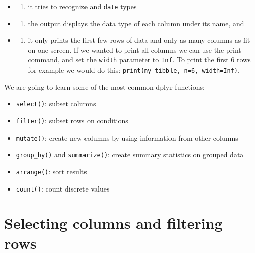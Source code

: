 \documentclass[
]{book}
\providecommand{\tightlist}{%
  \setlength{\itemsep}{0pt}\setlength{\parskip}{0pt}}
\begin{document}
\begin{itemize}
\item
  \begin{enumerate}
  \def\labelenumi{(\arabic{enumi})}
  \tightlist
  \item
    it tries to recognize and \texttt{date} types
  \end{enumerate}
\item
  \begin{enumerate}
  \def\labelenumi{(\arabic{enumi})}
  \setcounter{enumi}{1}
  \tightlist
  \item
    the output displays the data type of each column under its name, and
  \end{enumerate}
\item
  \begin{enumerate}
  \def\labelenumi{(\arabic{enumi})}
  \setcounter{enumi}{2}
  \tightlist
  \item
    it only prints the first few rows of data and only as many columns as
    fit on one screen. If we wanted to print all columns we can use the print command, and set the \texttt{width} parameter to \texttt{Inf}. To print the first 6 rows for example we would do this: \texttt{print(my\_tibble,\ n=6,\ width=Inf)}.
  \end{enumerate}
\end{itemize}

We are going to learn some of the most common dplyr functions:

\begin{itemize}
\tightlist
\item
  \texttt{select()}: subset columns
\item
  \texttt{filter()}: subset rows on conditions
\item
  \texttt{mutate()}: create new columns by using information from other columns
\item
  \texttt{group\_by()} and \texttt{summarize()}: create summary statistics on grouped data
\item
  \texttt{arrange()}: sort results
\item
  \texttt{count()}: count discrete values
\end{itemize}

\hypertarget{selecting-columns-and-filtering-rows}{%
\section{Selecting columns and filtering rows}\label{selecting-columns-and-filtering-rows}}
\end{document}
